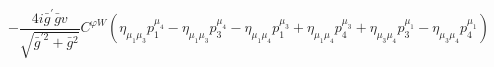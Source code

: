 %
\begin{dmath*}
%
  -  \frac{4 i {\bar g}^\prime {\bar g}{} v}{\sqrt{{\bar g}^{\prime 2} + {\bar g}{}^2}}C^{ \varphi  W} \left(\eta_{\mu_1 \mu_3} p_1^{\mu_4} - \eta_{\mu_1 \mu_3} p_3^{\mu_4} - \eta_{\mu_1 \mu_4} p_1^{\mu_3} + \eta_{\mu_1 \mu_4} p_4^{\mu_3} + \eta_{\mu_3 \mu_4} p_3^{\mu_1} - \eta_{\mu_3 \mu_4} p_4^{\mu_1}\right)
%
\end{dmath*}
%

